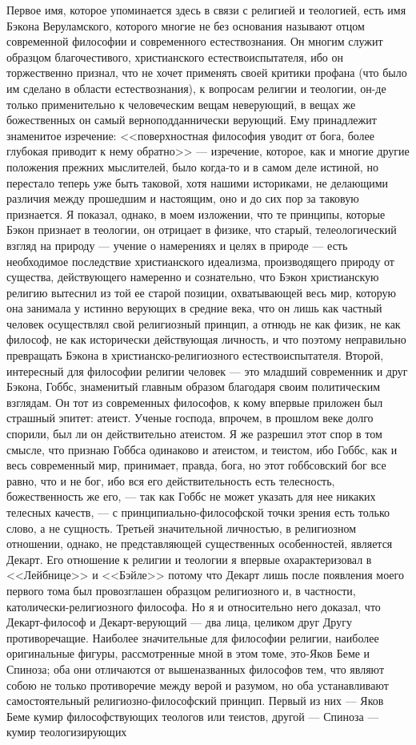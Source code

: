 \documentclass[12pt]{article}
\begin{document}
Первое имя, которое упоминается здесь в связи с религией и теологией, есть имя Бэкона Веруламского, которого многие не без основания называют отцом современной философии и современного естествознания. Он многим служит образцом благочестивого, христианского естествоиспытателя, ибо он торжественно признал, что не хочет применять своей критики профана (что было им сделано в области естествознания), к вопросам религии и теологии, он-де только применительно к человеческим вещам неверующий, в вещах же божественных он самый верноподданнически верующий. Ему принадлежит знаменитое изречение: <<поверхностная философия уводит от бога, более глубокая приводит к нему обратно>>  --- изречение, которое, как и многие другие положения прежних мыслителей, было когда-то и в самом деле истиной, но перестало теперь уже быть таковой, хотя нашими историками, не делающими различия между прошедшим и настоящим, оно и до сих пор за таковую признается. Я показал, однако, в моем изложении, что те принципы, которые Бэкон признает в теологии, он отрицает в физике, что старый, телеологический взгляд на природу --- учение о намерениях и целях в природе --- есть необходимое последствие христианского идеализма, производящего природу от существа, действующего намеренно и сознательно, что Бэкон христианскую религию вытеснил из той ее старой позиции, охватывающей весь мир, которую она занимала у истинно верующих в средние века, что он лишь как частный человек осуществлял свой религиозный принцип, а отнюдь не как физик, не как философ, не как исторически действующая личность, и что поэтому неправильно превращать Бэкона в христианско-религиозного естествоиспытателя. Второй, интересный для философии религии человек --- это младший современник и друг Бэкона, Гоббс, знаменитый главным образом благодаря своим политическим взглядам. Он тот из современных философов, к кому впервые приложен был страшный эпитет: атеист. Ученые господа, впрочем, в прошлом веке долго спорили, был ли он действительно атеистом. Я же разрешил этот спор в том смысле, что признаю Гоббса одинаково и атеистом, и теистом, ибо Гоббс, как и весь современный мир, принимает, правда, бога, но этот гоббсовский бог все равно, что и не бог, ибо вся его действительность есть телесность, божественность же его, --- так как Гоббс не может указать для нее никаких телесных качеств, --- с принципиально-философской точки зрения есть только слово, а не сущность. Третьей значительной личностью, в религиозном отношении, однако, не представляющей существенных особенностей, является Декарт. Его отношение к религии и теологии я впервые охарактеризовал в <<Лейбнице>> и <<Бэйле>>  потому что Декарт лишь после появления моего первого тома был провозглашен образцом религиозного и, в частности, католически-религиозного философа. Но я и относительно него доказал, что Декарт-философ и Декарт-верующий --- два лица, целиком друг Другу противоречащие. Наиболее значительные для философии религии, наиболее оригинальные фигуры, рассмотренные мной в этом томе, это-Яков Беме и Спиноза; оба они отличаются от вышеназванных философов тем, что являют собою не только противоречие между верой и разумом, но оба устанавливают самостоятельный религиозно-философский принцип. Первый из них --- Яков Беме кумир философствующих теологов или теистов, другой --- Спиноза --- кумир теологизирующих 
\end{document}
